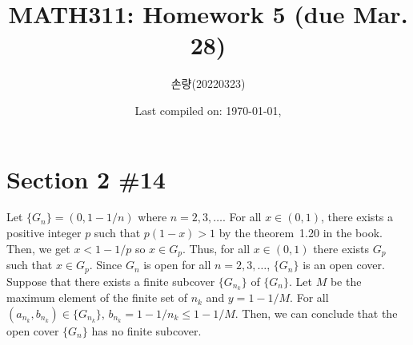 \documentclass{scrartcl}
\title{MATH311: Homework 5 (due Mar. 28)}
\author{손량(20220323)}
\date{Last compiled on: \today, \currenttime}
\begin{document}
\maketitle

\section{Section 2 \#14}
Let \(\{G_n\} = (0, 1 - 1 / n)\) where \(n = 2, 3, \dots\).
For all \(x \in (0, 1)\), there exists a positive integer \(p\) such that \(p(1 - x) > 1\) by the theorem~1.20 in the book.
Then, we get \(x < 1 - 1 / p\) so \(x \in G_p\).
Thus, for all \(x \in (0, 1)\) there exists \(G_p\) such that \(x \in G_p\).
Since \(G_n\) is open for all \(n = 2, 3, \dots\), \(\{G_n\}\) is an open cover.
Suppose that there exists a finite subcover \(\{G_{n_k}\}\) of \(\{G_n\}\).
Let \(M\) be the maximum element of the finite set of \(n_k\) and \(y = 1 - 1 / M\).
For all \((a_{n_k}, b_{n_k}) \in \{G_{n_k}\}\), \(b_{n_k} = 1 - 1 / n_k \leq 1 - 1 / M\).
Then, we can conclude that the open cover \(\{G_n\}\) has no finite subcover.
\end{document}
